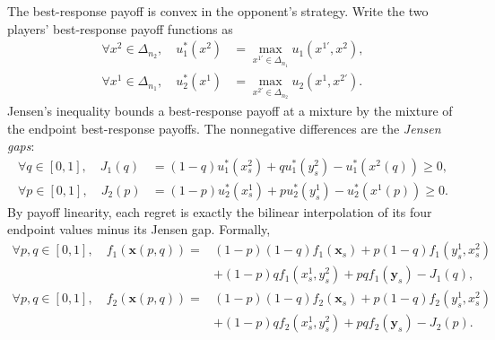 \documentclass[11pt]{article}
\theoremstyle{remark}
\theoremstyle{plain}
\begin{document}
The best-response payoff is convex in the opponent's strategy.
Write the two players' best-response payoff functions as
\[
 \begin{aligned}
  \forall x^2\in\Delta_{n_2},\quad
  u_1^*(x^2)&=\max_{x^{1\prime}\in\Delta_{n_1}}u_1(x^{1\prime},x^2),\\
  \forall x^1\in\Delta_{n_1},\quad
  u_2^*(x^1)&=\max_{x^{2\prime}\in\Delta_{n_2}}u_2(x^1,x^{2\prime}).
 \end{aligned}
\]
Jensen's inequality bounds a best-response payoff at a mixture by
the mixture of the endpoint best-response payoffs. The nonnegative
differences are the \emph{Jensen gaps}:
\begin{equation}
 \begin{aligned}
  \forall q\in[0,1],\quad
  J_1(q)&=(1-q)u_1^*(x_s^2)+q u_1^*(y_s^2)-u_1^*(x^2(q))\ge0,\\
  \forall p\in[0,1],\quad
  J_2(p)&=(1-p)u_2^*(x_s^1)+p u_2^*(y_s^1)-u_2^*(x^1(p))\ge0.
 \end{aligned}
 \label{eq:mixing-gaps}
\end{equation}
By payoff linearity, each regret is exactly the bilinear interpolation
of its four endpoint values minus its Jensen gap. Formally,
\begin{equation}
 \begin{aligned}
  \forall p,q\in[0,1],\quad
  f_1(\boldsymbol{x}(p,q))={}&
    (1-p)(1-q)f_1(\boldsymbol{x}_s)
    +p(1-q)f_1(y_s^1,x_s^2)\\
   &+(1-p)q f_1(x_s^1,y_s^2)
    +pq f_1(\boldsymbol{y}_s)-J_1(q),\\
  \forall p,q\in[0,1],\quad
  f_2(\boldsymbol{x}(p,q))={}&
    (1-p)(1-q)f_2(\boldsymbol{x}_s)
    +p(1-q)f_2(y_s^1,x_s^2)\\
   &+(1-p)q f_2(x_s^1,y_s^2)
    +pq f_2(\boldsymbol{y}_s)-J_2(p).
 \end{aligned}
 \label{eq:mixing-regrets}
\end{equation}
\end{document}
